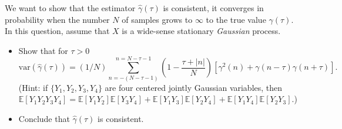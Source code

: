 \documentclass[11pt]{article}
\begin{document}

\begin{solution}

\end{solution}

\begin{exercise}
    We want to show that the estimator $\hat{\gamma}(\tau)$ is consistent, \ie it converges in probability when the number $N$ of samples grows to $\infty$ to the true value ${\gamma}(\tau)$.
    In this question, assume that $X$ is a wide-sense stationary \textit{Gaussian} process.
    \begin{itemize}
        \item Show that for $\tau>0$
    \begin{equation}
       \text{var}(\hat{\gamma}(\tau)) = (1/N) \sum_{n=-(N-\tau-1)}^{n=N-\tau-1} \left(1 - \frac{\tau + |n|}{N}\right) \left[\gamma^2(n) + \gamma(n-\tau)\gamma(n+\tau)\right].
    \end{equation}
    (Hint: if $\{Y_1, Y_2, Y_3, Y_4\}$ are four centered jointly Gaussian variables, then $\mathbb{E}[Y_1 Y_2 Y_3 Y_4] = \mathbb{E}[Y_1 Y_2]\mathbb{E}[Y_3 Y_4] + \mathbb{E}[Y_1 Y_3]\mathbb{E}[Y_2 Y_4] + \mathbb{E}[Y_1 Y_4]\mathbb{E}[Y_2 Y_3]$.)
    \item Conclude that $\hat{\gamma}(\tau)$ is consistent.
    \end{itemize}
\end{exercise}
\end{document}
